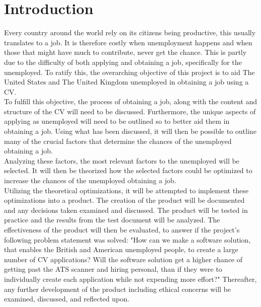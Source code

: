 \section{Introduction}\label{sec:introduction}
Every country around the world rely on its citizens being productive, this usually translates to a job. 
It is therefore costly when unemployment happens and when those that might have much to contribute, never get the chance. 
This is partly due to the difficulty of both applying and obtaining a job, specifically for the unemployed. 
To ratify this, the overarching objective of this project is to aid The United States and The United Kingdom unemployed in obtaining a job using a CV. \\

To fulfill this objective, the process of obtaining a job, along with the content and structure of the CV will need to be discussed.
Furthermore, the unique aspects of applying as unemployed will need to be outlined so to better aid them in obtaining a job.
Using what has been discussed, it will then be possible to outline many of the crucial factors that determine the chances of the unemployed obtaining a job. \\

Analyzing these factors, the most relevant factors to the unemployed will be selected.
It will then be theorized how the selected factors could be optimized to increase the chances of the unemployed obtaining a job. \\

Utilizing the theoretical optimizations, it will be attempted to implement these optimizations into a product.
The creation of the product will be documented and any decisions taken examined and discussed. 
The product will be tested in practice and the results from the test document will be analyzed.
The effectiveness of the product will then be evaluated, to answer if the project's following problem statement was solved: "How can we make a software solution, that enables the British and American unemployed people, 
to create a large number of CV applications?
Will the software solution get a higher chance of getting past the ATS scanner and hiring personal, than
if they were to individually create each application while not expending more effort?"
Thereafter, any further development of the product including ethical concerns will be examined, discussed, and reflected upon. \\

\newpage

